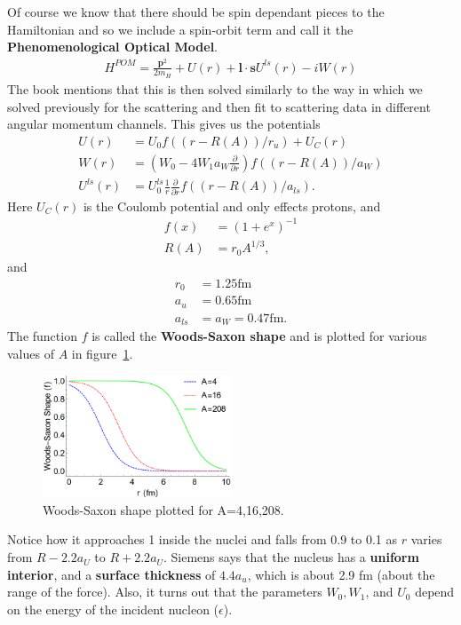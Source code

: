 \documentclass[12pt]{extarticle}
\begin{document}
Of course we know that there should be spin dependant pieces to the Hamiltonian and so we include a spin-orbit term and call it the \textbf{Phenomenological Optical Model}.
\begin{align}
   H^{POM}=\frac{\mathbf{p}^2}{2m_H} + U(r) + \mathbf{l}\cdot\mathbf{s}U^{ls}(r) - iW(r)
\end{align}
The book mentions that this is then solved similarly to the way in which we solved previously for the scattering and then fit to scattering data in different angular momentum channels. This gives us the potentials
\begin{align}
   U(r) &= U_0f((r-R(A))/r_u)+U_C(r) \\
   W(r) &= \left(W_0-4W_1a_W\frac{\partial}{\partial r}\right)f((r-R(A))/a_W) \\
   U^{ls}(r) &= U^{ls}_0\frac{1}{r}\frac{\partial}{\partial r}f((r-R(A))/a_{ls}).
\end{align}
Here $U_C(r)$ is the Coulomb potential and only effects protons, and 
\begin{align}
   f(x) &= (1+e^{x})^{-1} \\
   R(A) &= r_0 A^{1/3},
\end{align}
and
\begin{align}
   r_0 &= 1.25 \mathrm{fm} \\
   a_u &= 0.65 \mathrm{fm} \\
   a_{ls} &= a_W = 0.47 \mathrm{fm}.
\end{align}
The function $f$ is called the \textbf{Woods-Saxon shape} and is plotted for various values of $A$ in figure~\ref{fig:woodssaxon}.
\begin{figure}[h]
   \centering
   \includegraphics[width=0.5\textwidth]{woodssaxon.png}
   \caption{Woods-Saxon shape plotted for A=4,16,208.}
   \label{fig:woodssaxon}
\end{figure}
Notice how it approaches 1 inside the nuclei and falls from 0.9 to 0.1 as $r$ varies from $R-2.2a_U$ to $R+2.2a_U$. Siemens says that the nucleus has a \textbf{uniform interior}, and a \textbf{surface thickness} of $4.4a_u$, which is about 2.9 fm (about the range of the force). Also, it turns out that the parameters $W_0, W_1$, and $U_0$ depend on the energy of the incident nucleon ($\epsilon$).
\end{document}
